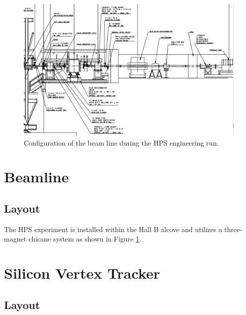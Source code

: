 \begin{figure}
    \centering
    \includegraphics[width=\textwidth]{images/beamline.png}
    \caption{Configuration of the beam line during the HPS engineering run.}
    \label{fig:beamline}
\end{figure}

\section{Beamline}

\subsection{Layout}

The HPS experiment is installed within the Hall B alcove and utilizes a 
three-magnet chicane system as shown in Figure \ref{fig:beamline}. 





\section{Silicon Vertex Tracker}

\subsection{Layout}

